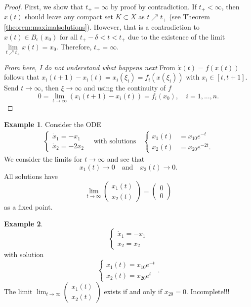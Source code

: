 \documentclass[hidelinks,a4paper, 11pt]{article}
\theoremstyle{plain}
\theoremstyle{break}
\theoremstyle{plain}
\theoremstyle{definition}
\newtheorem*{example}{Example}
\begin{document}
\begin{proof}
	First, we show that $t_+ = \infty$ by proof by contradiction. If $t_+ < \infty$, then $x(t)$ should leave any compact set $K \subset X$ as $t \nearrow t_+$ (see Theorem \ref{theorem:maximalsolutions}). However, that is a contradiction to $x(t) \in B_{\epsilon}(x_0)$ for all $t_+-\delta < t < t_+$ due to the existence of the limit $\lim\limits_{t \nearrow t_+}x(t) = x_0$. Therefore, $t_+ = \infty$.
	
	\textit{From here, I do not understand what happens next}
	From $\dot x(t) = f(x(t))$ follows that $x_i(t+1)-x_i(t) = x_i(\xi_i) = f_i(x(\xi_i))$ with $x_i \in [t,t+1]$. Send $t \to \infty$, then $\xi \to \infty$ and using the continuity of $f$
	\[
		0 = \lim_{t \to \infty}(x_i(t+1)-x_i(t)) = f_i(x_0), \quad i = 1,...,n.
	\]
\end{proof}

\begin{example}
	Consider the ODE
	\begin{align*}
		\begin{cases}
			\dot x_1 = -x_1 \\
			\dot x_2 = -2x_2
		\end{cases} \quad \text{with solutions} \quad 		\begin{cases}x_1(t) &= x_{10}e^{-t} \\
		x_2(t) &= x_{20}e^{-2t}.
		\end{cases}
	\end{align*}
	We consider the limits for $t \to \infty $ and see that
	\[
		x_1(t) \to 0 \quad \text{and} \quad x_2(t) \to 0.
	\]
	All solutions have 
	\[
		\lim_{t \to \infty} \begin{pmatrix}
			x_1(t) \\ x_2(t)
		\end{pmatrix} = \begin{pmatrix}
			0 \\ 0
		\end{pmatrix}
	\]
	as a fixed point.
\end{example}

\begin{example}
	\[
		\begin{cases}
			\dot x_1 = -x_1 \\
			\dot x_2 = x_2
		\end{cases}
	\]
	with solution 
	\[
		\begin{cases}
			x_1(t) = x_{10}e^{-t}  \\
			x_2(t) = x_{20}e^{t}
		\end{cases}.
	\]
	The limit $\lim_{t \to \infty} \begin{pmatrix}
		x_1(t) \\ x_2(t)
	\end{pmatrix}$ exists if and only if $x_{20} = 0$. Incomplete!!!
\end{example}
\end{document}
